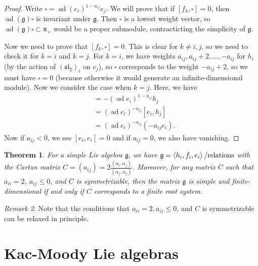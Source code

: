 \documentclass[leqno, openany]{memoir}
\newtheorem{thm}{Theorem}[section]
\theoremstyle{definition}
\theoremstyle{remark}
\newtheorem{rmk}[thm]{Remark}
\theoremstyle{plain}
\theoremstyle{definition}
\theoremstyle{remark}
\newcommand{\mf}[1]{\mathfrak{#1}}
\DeclareMathOperator{\ad}{ad}
\begin{document}
\begin{proof}
    Write $\square = {\ad(e_i)}^{1-a_{ij}} e_j$. We will prove that if $[f_k, \square] = 0$, then $\ad(\mf{g}) \square$ is invariant under $\mf{g}$. Then $\square$ is a lowest weight vector, so $\ad(\mf{g}) \square \subset \mf{n}_+$ would be a proper submodule, contracticting the simplicity of $\mf{g}$.

    Now we need to prove that $[f_k, \square] = 0$. This is clear for $k \neq i,j$, so we need to check it for $k=i$ and $k=j$. For $k=i$, we have weights $a_{ij}, a_{ij}+2, \ldots, -a_{ij}$ for $h_i$ (by the action of ${(\mf{sl}_2)}_i$ on $e_j$), so $\square$ corresponds to the weight $-a_{ij} + 2$, so we must have $\square = 0$ (because otherwise it would generate an infinite-dimensional module). Now we consider the case when $k=j$. Here, we have
    \begin{align*}
        [f_j, {(\ad e_i)}^{1-a_{ij}} e_j] &= - {(\ad e_i)}^{1-a_{ij}} h_j \\
                                          &= {(\ad e_i)}^{-a_{ij}} [e_i, h_j] \\
                                          &= {(\ad e_i)}^{-a_{ij}} (-a_{ij} e_i).
    \end{align*}
    Now if $a_{ij} < 0$, we see $[e_i, e_i] = 0$ and if $a_{ij} = 0$, we also have vanishing.
\end{proof}

\begin{thm}
    For a simple Lie algebra $\mf{g}$, we have $\mf{g} = \ev{h_i, f_i, e_i} / \text{relations}$ with the Cartan matrix $C = (a_{ij}) = 2 \frac{(\alpha_i, \alpha_j)}{(\alpha_j, \alpha_j)}$. Moreover, for any matrix $C$ such that $a_{ii} = 2$, $a_{ij} \leq 0$, and $C$ is symmetrizable, then the matrix $\mf{g}$ is simple and finite-dimensional if and only if $C$ corresponds to a finite root system.
\end{thm}

\begin{rmk}
    Note that the conditions that $a_{ii} = 2, a_{ij} \leq 0$, and $C$ is symmetrizable can be relaxed in principle.
\end{rmk}

\section{Kac-Moody Lie algebras}%
\label{sec:kac_moody_lie_algebras}
\end{document}
